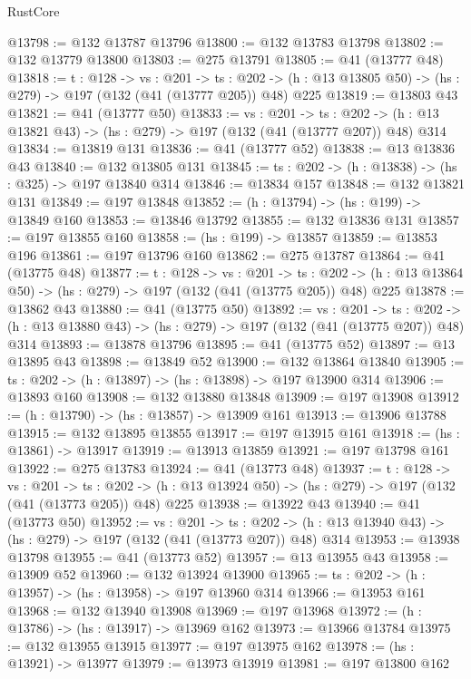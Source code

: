 \begin{lexlean}{RustCore}
\begin{coremodule}
@13798 := @132 @13787 @13796
@13800 := @132 @13783 @13798
@13802 := @132 @13779 @13800
@13803 := @275 @13791
@13805 := @41 (@13777 @48)
@13818 := {t : @128} ->
  {vs : @201} ->
  {ts : @202} -> (h : @13 @13805 @50) -> (hs : @279) -> @197 (@132 (@41 (@13777 @205)) @48) @225
@13819 := @13803 @43
@13821 := @41 (@13777 @50)
@13833 := {vs : @201} ->
  {ts : @202} -> (h : @13 @13821 @43) -> (hs : @279) -> @197 (@132 (@41 (@13777 @207)) @48) @314
@13834 := @13819 @131
@13836 := @41 (@13777 @52)
@13838 := @13 @13836 @43
@13840 := @132 @13805 @131
@13845 := {ts : @202} -> (h : @13838) -> (hs : @325) -> @197 @13840 @314
@13846 := @13834 @157
@13848 := @132 @13821 @131
@13849 := @197 @13848
@13852 := (h : @13794) -> (hs : @199) -> @13849 @160
@13853 := @13846 @13792
@13855 := @132 @13836 @131
@13857 := @197 @13855 @160
@13858 := (hs : @199) -> @13857
@13859 := @13853 @196
@13861 := @197 @13796 @160
@13862 := @275 @13787
@13864 := @41 (@13775 @48)
@13877 := {t : @128} ->
  {vs : @201} ->
  {ts : @202} -> (h : @13 @13864 @50) -> (hs : @279) -> @197 (@132 (@41 (@13775 @205)) @48) @225
@13878 := @13862 @43
@13880 := @41 (@13775 @50)
@13892 := {vs : @201} ->
  {ts : @202} -> (h : @13 @13880 @43) -> (hs : @279) -> @197 (@132 (@41 (@13775 @207)) @48) @314
@13893 := @13878 @13796
@13895 := @41 (@13775 @52)
@13897 := @13 @13895 @43
@13898 := @13849 @52
@13900 := @132 @13864 @13840
@13905 := {ts : @202} -> (h : @13897) -> (hs : @13898) -> @197 @13900 @314
@13906 := @13893 @160
@13908 := @132 @13880 @13848
@13909 := @197 @13908
@13912 := (h : @13790) -> (hs : @13857) -> @13909 @161
@13913 := @13906 @13788
@13915 := @132 @13895 @13855
@13917 := @197 @13915 @161
@13918 := (hs : @13861) -> @13917
@13919 := @13913 @13859
@13921 := @197 @13798 @161
@13922 := @275 @13783
@13924 := @41 (@13773 @48)
@13937 := {t : @128} ->
  {vs : @201} ->
  {ts : @202} -> (h : @13 @13924 @50) -> (hs : @279) -> @197 (@132 (@41 (@13773 @205)) @48) @225
@13938 := @13922 @43
@13940 := @41 (@13773 @50)
@13952 := {vs : @201} ->
  {ts : @202} -> (h : @13 @13940 @43) -> (hs : @279) -> @197 (@132 (@41 (@13773 @207)) @48) @314
@13953 := @13938 @13798
@13955 := @41 (@13773 @52)
@13957 := @13 @13955 @43
@13958 := @13909 @52
@13960 := @132 @13924 @13900
@13965 := {ts : @202} -> (h : @13957) -> (hs : @13958) -> @197 @13960 @314
@13966 := @13953 @161
@13968 := @132 @13940 @13908
@13969 := @197 @13968
@13972 := (h : @13786) -> (hs : @13917) -> @13969 @162
@13973 := @13966 @13784
@13975 := @132 @13955 @13915
@13977 := @197 @13975 @162
@13978 := (hs : @13921) -> @13977
@13979 := @13973 @13919
@13981 := @197 @13800 @162

\end{coremodule}
\end{lexlean}
